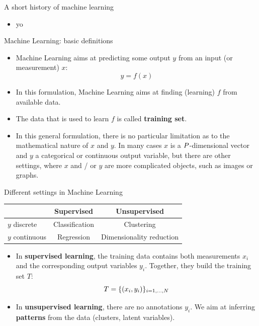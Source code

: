 \documentclass[xcolor=pdftex,dvipsnames,table]{beamer}
\begin{document}
\begin{frame}{A short history of machine learning}
\begin{itemize}
	\item yo
\end{itemize}
\end{frame}

\begin{frame}{Machine Learning: basic definitions}
\begin{itemize}
	\item Machine Learning aims at predicting some output $y$ from an input (or measurement) $x$:
	\begin{equation}
	y = f(x)
	\end{equation}
	\item In this formulation, Machine Learning aims at finding (learning) $f$ from available data. 
	\item The data that is used to learn $f$ is called \textbf{training set}. 
	\item In this general formulation, there is no particular limitation as to the mathematical nature of $x$ and $y$. In many cases $x$ is a $P$-dimensional vector and $y$ a categorical or continuous output variable, but there are other settings, where $x$ and / or $y$ are more complicated objects, such as images or graphs.
\end{itemize}
\end{frame}

\begin{frame}{Different settings in Machine Learning}
	\begin{table}
	\begin{tabular}{|l || c | c | }
		\hline
 		& Supervised & Unsupervised \\
		\hline \hline
		$y$ discrete & Classification & Clustering \\ 
		$y$ continuous & Regression & Dimensionality reduction\\ 
		\hline
	\end{tabular}
	\end{table}
\begin{itemize}
	\item In \textbf{supervised learning}, the training data contains both measurements $x_i$ and the corresponding output variables $y_i$. Together, they build the training set $T$:
	\begin{equation}
	T = \{(x_i, y_i)\}_{i=1, \ldots, N}
	\end{equation}
	\item In \textbf{unsupervised learning}, there are no annotations $y_i$. We aim at inferring \textbf{patterns} from the data (clusters, latent variables). 
\end{itemize}
\end{frame}
\end{document}
